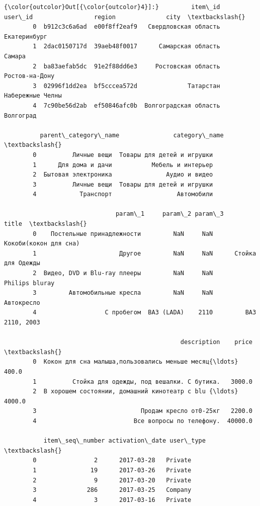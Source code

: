\documentclass[11pt]{article}
\begin{document}
\begin{Verbatim}[commandchars=\\\{\}]
{\color{outcolor}Out[{\color{outcolor}4}]:}         item\_id       user\_id                 region              city  \textbackslash{}
        0  b912c3c6a6ad  e00f8ff2eaf9   Свердловская область      Екатеринбург   
        1  2dac0150717d  39aeb48f0017      Самарская область            Самара   
        2  ba83aefab5dc  91e2f88dd6e3     Ростовская область    Ростов-на-Дону   
        3  02996f1dd2ea  bf5cccea572d              Татарстан  Набережные Челны   
        4  7c90be56d2ab  ef50846afc0b  Волгоградская область         Волгоград   
        
          parent\_category\_name               category\_name  \textbackslash{}
        0          Личные вещи  Товары для детей и игрушки   
        1      Для дома и дачи           Мебель и интерьер   
        2  Бытовая электроника               Аудио и видео   
        3          Личные вещи  Товары для детей и игрушки   
        4            Транспорт                  Автомобили   
        
                               param\_1     param\_2 param\_3                  title  \textbackslash{}
        0    Постельные принадлежности         NaN     NaN  Кокоби(кокон для сна)   
        1                       Другое         NaN     NaN      Стойка для Одежды   
        2  Видео, DVD и Blu-ray плееры         NaN     NaN         Philips bluray   
        3         Автомобильные кресла         NaN     NaN             Автокресло   
        4                   С пробегом  ВАЗ (LADA)    2110         ВАЗ 2110, 2003   
        
                                                 description    price  \textbackslash{}
        0  Кокон для сна малыша,пользовались меньше месяц{\ldots}    400.0   
        1          Стойка для одежды, под вешалки. С бутика.   3000.0   
        2  В хорошем состоянии, домашний кинотеатр с blu {\ldots}   4000.0   
        3                             Продам кресло от0-25кг   2200.0   
        4                           Все вопросы по телефону.  40000.0   
        
           item\_seq\_number activation\_date user\_type  \textbackslash{}
        0                2      2017-03-28   Private   
        1               19      2017-03-26   Private   
        2                9      2017-03-20   Private   
        3              286      2017-03-25   Company   
        4                3      2017-03-16   Private   
        

\end{Verbatim}
\end{document}
